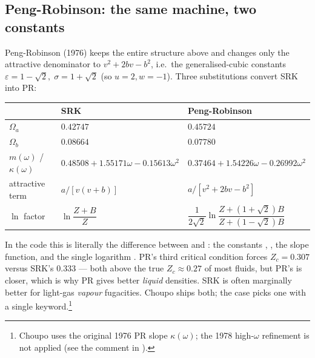 \documentclass[11pt,a4paper]{article}
\begin{document}
\subsection{Peng-Robinson: the same machine, two constants}

Peng-Robinson (1976) \cite{PengRobinson1976} keeps the entire
structure above and changes only the attractive denominator to
$v^2 + 2bv - b^2$, i.e.\ the generalised-cubic constants
$\varepsilon = 1-\sqrt2,\;\sigma = 1+\sqrt2$ (so $u=2, w=-1$).  Three
substitutions convert SRK into PR:
\begin{center}
\begin{tabular}{lll}
\hline
                       & \textbf{SRK} & \textbf{Peng-Robinson} \\
\hline
$\Omega_a$             & $0.42747$    & $0.45724$ \\
$\Omega_b$             & $0.08664$    & $0.07780$ \\
$m(\omega)$ / $\kappa(\omega)$
                       & $0.48508 + 1.55171\omega - 0.15613\omega^2$
                       & $0.37464 + 1.54226\omega - 0.26992\omega^2$ \\
attractive term        & $a/[v(v+b)]$ & $a/[v^2 + 2bv - b^2]$ \\
$\ln$ factor           & $\ln\!\dfrac{Z+B}{Z}$
                       & $\dfrac{1}{2\sqrt2}\ln\!\dfrac{Z+(1+\sqrt2)B}{Z+(1-\sqrt2)B}$ \\
\hline
\end{tabular}
\end{center}
In the code this is literally the difference between
 and : the constants
, , the slope function, and the single
logarithm .  PR's third critical condition forces
$Z_c = 0.307$ versus SRK's $0.333$ --- both above the true $Z_c
\approx 0.27$ of most fluids, but PR's is closer, which is why PR
gives better \emph{liquid} densities.  SRK is often marginally better
for light-gas \emph{vapour} fugacities.  Choupo ships both; the case
picks one with a single keyword.\footnote{Choupo uses the original
1976 PR slope $\kappa(\omega)$; the 1978 high-$\omega$ refinement is
not applied (see the comment in ).}
\end{document}
